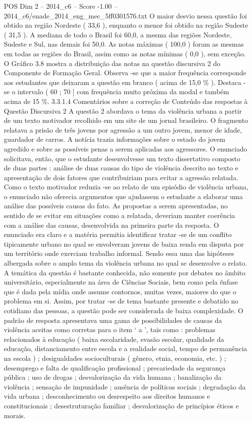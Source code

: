 \begin{textsample}{POS Dim 2 – 2014\_c6 – Score -1.00 – 2014\_c6/enade\_2014\_eng\_mec\_5ff0301576.txt}
O maior desvio nessa questão foi obtido na região Nordeste ( 33,6 ), enquanto o menor foi obtido na região Sudeste ( 31,5 ).
A mediana de todo o Brasil foi 60,0, a mesma das regiões Nordeste, Sudeste e Sul, nas demais foi 50,0.
As notas máximas ( 100,0 ) foram as mesmas em todas as regiões do Brasil, assim como as notas mínimas ( 0,0 ), sem exceção.
O Gráfico 3.8 mostra a distribuição das notas na questão discursiva 2 do Componente de Formação Geral.
Observa -se que a maior frequência corresponde aos estudantes que deixaram a questão em branco ( acima de 15,0 \% ).
Destaca -se o intervalo ( 60 ; 70 ] com frequência muito próxima da modal e também acima de 15 \%. 3.3.1.4 Comentários sobre a correção de Conteúdo das respostas à Questão Discursiva 2 A questão 2 abordava o tema da violência urbana a partir de um texto motivador recolhido em um site de um jornal brasileiro.
O fragmento relatava a prisão de três jovens por agressão a um outro jovem, menor de idade, guardador de carros.
A notícia trazia informações sobre o estado do jovem agredido e sobre as possíveis penas a serem aplicadas aos agressores.
O enunciado solicitava, então, que o estudante desenvolvesse um texto dissertativo composto de duas partes : análise de duas causas do tipo de violência descrito no texto e apresentação de dois fatores que contribuiriam para evitar a agressão relatada.
Como o texto motivador reduzia -se ao relato de um episódio de violência urbana, o enunciado não oferecia argumentos que ajudassem o estudante a elaborar uma análise das possíveis causas do fato.
As propostas a serem apresentadas, no sentido de se evitar em situações como a relatada, deveriam manter coerência com a análise das causas, desenvolvida na primeira parte da resposta.
O enunciado era claro e a matéria permitia identificar tratar -se de um conflito tipicamente urbano no qual se envolveram jovens de baixa renda em disputa por um território onde exerciam trabalho informal.
Sendo essa uma das hipóteses albergada sobre o amplo tema da violência urbana no qual se desenvolve o relato.
A temática da questão é bastante conhecida, não somente por debates no âmbito universitário, especialmente na área de Ciências Sociais, bem como pela ênfase que é dada pela mídia onde assume contornos, muitas vezes, maiores do que o problema em si.
Assim, por tratar -se de tema bastante presente e debatido no cotidiano das pessoas, a questão pode ser considerada de baixa complexidade.
O padrão de resposta apresentava uma gama de possibilidades de causas da violência aceitas como corretas para o item ‘ a ’, tais como : problemas relacionados à educação ( baixa escolaridade, evasão escolar, qualidade da educação, distanciamento entre escola e a realidade social, tempo de permanência na escola ) ; desigualdades socioculturais ( gênero, etnia, economia, etc. ) ; desemprego e falta de qualificação profissional ; precariedade da segurança pública ; uso de drogas ; desvalorização da vida humana ; banalização da violência ; sensação de impunidade ; ausência de políticas sociais ; degradação da vida urbana ; desconhecimento ou desrespeito aos direitos humanos e constitucionais ; desestruturação familiar ; desvalorização de princípios éticos e morais.

\end{textsample}
